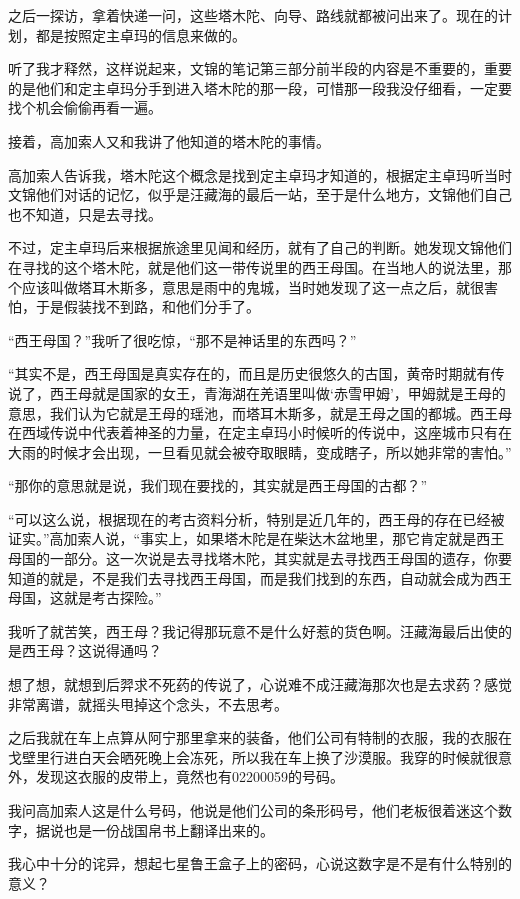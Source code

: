 之后一探访，拿着快递一问，这些塔木陀、向导、路线就都被问出来了。现在的计划，都是按照定主卓玛的信息来做的。

听了我才释然，这样说起来，文锦的笔记第三部分前半段的内容是不重要的，重要的是他们和定主卓玛分手到进入塔木陀的那一段，可惜那一段我没仔细看，一定要找个机会偷偷再看一遍。

接着，高加索人又和我讲了他知道的塔木陀的事情。

高加索人告诉我，塔木陀这个概念是找到定主卓玛才知道的，根据定主卓玛听当时文锦他们对话的记忆，似乎是汪藏海的最后一站，至于是什么地方，文锦他们自己也不知道，只是去寻找。

不过，定主卓玛后来根据旅途里见闻和经历，就有了自己的判断。她发现文锦他们在寻找的这个塔木陀，就是他们这一带传说里的西王母国。在当地人的说法里，那个应该叫做塔耳木斯多，意思是雨中的鬼城，当时她发现了这一点之后，就很害怕，于是假装找不到路，和他们分手了。

“西王母国？”我听了很吃惊，“那不是神话里的东西吗？”

“其实不是，西王母国是真实存在的，而且是历史很悠久的古国，黄帝时期就有传说了，西王母就是国家的女王，青海湖在羌语里叫做‘赤雪甲姆’，甲姆就是王母的意思，我们认为它就是王母的瑶池，而塔耳木斯多，就是王母之国的都城。西王母在西域传说中代表着神圣的力量，在定主卓玛小时候听的传说中，这座城市只有在大雨的时候才会出现，一旦看见就会被夺取眼睛，变成瞎子，所以她非常的害怕。”

“那你的意思就是说，我们现在要找的，其实就是西王母国的古都？”

“可以这么说，根据现在的考古资料分析，特别是近几年的，西王母的存在已经被证实。”高加索人说，“事实上，如果塔木陀是在柴达木盆地里，那它肯定就是西王母国的一部分。这一次说是去寻找塔木陀，其实就是去寻找西王母国的遗存，你要知道的就是，不是我们去寻找西王母国，而是我们找到的东西，自动就会成为西王母国，这就是考古探险。”

我听了就苦笑，西王母？我记得那玩意不是什么好惹的货色啊。汪藏海最后出使的是西王母？这说得通吗？

想了想，就想到后羿求不死药的传说了，心说难不成汪藏海那次也是去求药？感觉非常离谱，就摇头甩掉这个念头，不去思考。

之后我就在车上点算从阿宁那里拿来的装备，他们公司有特制的衣服，我的衣服在戈壁里行进白天会晒死晚上会冻死，所以我在车上换了沙漠服。我穿的时候就很意外，发现这衣服的皮带上，竟然也有02200059的号码。

我问高加索人这是什么号码，他说是他们公司的条形码号，他们老板很着迷这个数字，据说也是一份战国帛书上翻译出来的。

我心中十分的诧异，想起七星鲁王盒子上的密码，心说这数字是不是有什么特别的意义？

